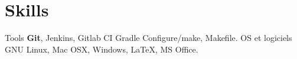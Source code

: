 \documentclass[10pt,a4paper,sans]{moderncv}%
\begin{document}
\section{Skills}
{Tools}{
    \textbf{Git},
    Jenkins,
    Gitlab CI
    \newline
    Gradle
    Configure/make,
    Makefile.
}
{OS et logiciels}{
    GNU Linux,
    Mac OSX,
    Windows,
    \newline
    \LaTeX,
    MS Office.
}


\end{document}
